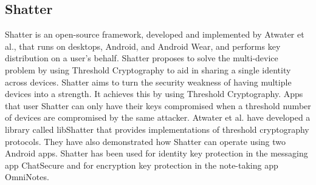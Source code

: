 \subsection{Shatter}

Shatter is an open-source framework, developed and implemented by Atwater et al.\cite{Atwater2016}, that runs on desktops, Android, and Android Wear, and performs key distribution on a user's behalf. Shatter proposes to solve the multi-device problem by using Threshold Cryptography to aid in sharing a single identity across devices. Shatter aims to turn the security weakness of having multiple devices into a strength. It achieves this by using Threshold Cryptography\cite{Desmedt1994, Desmedt2001}. Apps that user Shatter can only have their keys compromised when a threshold number of devices are compromised by the same attacker. Atwater et al.\cite{Atwater2016} have developed a library called libShatter that provides implementations of threshold cryptography protocols. They have also demonstrated how Shatter can operate using two Android apps. Shatter has been used for identity key protection in the messaging app ChatSecure and for encryption key protection in the note-taking app OmniNotes.

